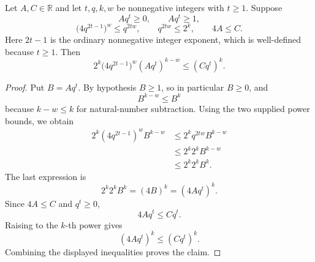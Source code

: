 \begin{helper}
Let \(A,C\in\mathbb R\) and let \(t,q,k,w\) be nonnegative integers with
\(t\ge1\).  Suppose
\[
  Aq^t\ge0,\qquad Aq^t\ge1,
\]
\[
  \bigl(4q^{2t-1}\bigr)^w\le q^{2tw},
  \qquad
  q^{2tw}\le2^k,
  \qquad
  4A\le C.
\]
Here \(2t-1\) is the ordinary nonnegative integer exponent, which is
well-defined because \(t\ge1\).
Then
\[
  2^k\bigl(4q^{2t-1}\bigr)^w(Aq^t)^{k-w}\le (Cq^t)^k.
\]
\end{helper}
\begin{proof}
Put \(B=Aq^t\).  By hypothesis \(B\ge1\), so in particular \(B\ge0\), and
\[
  B^{k-w}\le B^k
\]
because \(k-w\le k\) for natural-number subtraction.  Using the two supplied
power bounds, we obtain
\[
\begin{aligned}
  2^k(4q^{2t-1})^w B^{k-w}
  &\le 2^k q^{2tw} B^{k-w} \\
  &\le 2^k2^k B^{k-w} \\
  &\le 2^k2^k B^k.
\end{aligned}
\]
The last expression is
\[
  2^k2^kB^k=(4B)^k=(4Aq^t)^k.
\]
Since \(4A\le C\) and \(q^t\ge0\),
\[
  4Aq^t\le Cq^t.
\]
Raising to the \(k\)-th power gives
\[
  (4Aq^t)^k\le(Cq^t)^k.
\]
Combining the displayed inequalities proves the claim.
\end{proof}
